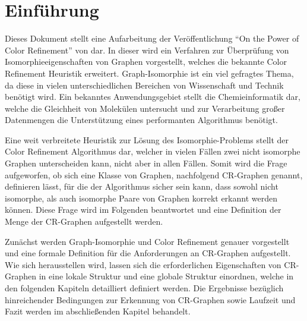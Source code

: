 \section{Einführung}
\label{sec/einfuehrung}

Dieses Dokument stellt eine Aufarbeitung der Veröffentlichung \enquote{On the Power of Color Refinement} von \cite{Arvind2015} dar.
In dieser wird ein Verfahren zur Überprüfung von Isomorphieeigenschaften von Graphen vorgestellt, welches die bekannte Color Refinement Heuristik erweitert.
Graph-Isomorphie ist ein viel gefragtes Thema, da diese in vielen unterschiedlichen Bereichen von Wissenschaft und Technik benötigt wird.
Ein bekanntes Anwendungsgebiet stellt die Chemieinformatik dar, welche die Gleichheit von Molekülen untersucht und zur Verarbeitung großer Datenmengen die Unterstützung eines performanten Algorithmus benötigt.

Eine weit verbreitete Heuristik zur Lösung des Isomorphie-Problems stellt der Color Refinement Algorithmus dar, welcher in vielen Fällen zwei nicht isomorphe Graphen unterscheiden kann, nicht aber in allen Fällen.
Somit wird die Frage aufgeworfen, ob sich eine Klasse von Graphen, nachfolgend CR-Graphen genannt, definieren lässt, für die der Algorithmus sicher sein kann, dass sowohl nicht isomorphe, als auch isomorphe Paare von Graphen korrekt erkannt werden können.
Diese Frage wird im Folgenden beantwortet und eine Definition der Menge der CR-Graphen aufgestellt werden.

Zunächst werden Graph-Isomorphie und Color Refinement genauer vorgestellt und eine formale Definition für die Anforderungen an CR-Graphen aufgestellt.
Wie sich herausstellen wird, lassen sich die erforderlichen Eigenschaften von CR-Graphen in eine lokale Struktur und eine globale Struktur einordnen, welche in den folgenden Kapiteln detailliert definiert werden.
Die Ergebnisse bezüglich hinreichender Bedingungen zur Erkennung von CR-Graphen sowie Laufzeit und Fazit werden im abschließenden Kapitel behandelt.